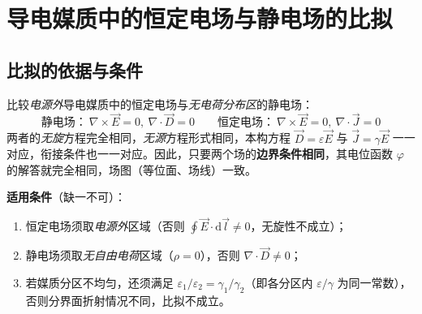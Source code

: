 \section{导电媒质中的恒定电场与静电场的比拟}

\subsection{比拟的依据与条件}
比较\emph{电源外}导电媒质中的恒定电场与\emph{无电荷分布区}的静电场：
\[
\text{静电场：}\ \nabla\times\vec{E}=0,\ \nabla\cdot\vec{D}=0
\qquad
\text{恒定电场：}\ \nabla\times\vec{E}=0,\ \nabla\cdot\vec{J}=0
\]
两者的\emph{无旋}方程完全相同，\emph{无源}方程形式相同，本构方程 $\vec{D}=\varepsilon\vec{E}$ 与 $\vec{J}=\gamma\vec{E}$ 一一对应，衔接条件也一一对应。因此，只要两个场的\textbf{边界条件相同}，其电位函数 $\varphi$ 的解答就完全相同，场图（等位面、场线）一致。

\textbf{适用条件}（缺一不可）：
\begin{enumerate}
  \item 恒定电场须取\emph{电源外}区域（否则 $\oint\vec{E}\cdot\mathrm{d}\vec{l}\neq0$，无旋性不成立）；
  \item 静电场须取\emph{无自由电荷}区域（$\rho=0$），否则 $\nabla\cdot\vec{D}\neq0$；
  \item 若媒质分区不均匀，还须满足 $\varepsilon_1/\varepsilon_2=\gamma_1/\gamma_2$（即各分区内 $\varepsilon/\gamma$ 为同一常数），否则分界面折射情况不同，比拟不成立。
\end{enumerate}

